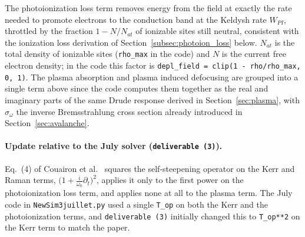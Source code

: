 The photoionization loss term removes energy from the field at exactly the rate needed to promote electrons to the conduction band at the Keldysh rate $W_{PI}$, throttled by the fraction $1-N/N_{at}$ of ionizable sites still neutral, consistent with the ionization loss derivation of Section~\ref{subsec:photoion_loss} below. $N_{at}$ is the total density of ionizable sites (\texttt{rho\_max} in the code) and $N$ is the current free electron density; in the code this factor is \texttt{depl\_field = clip(1 - rho/rho\_max, 0, 1)}. The plasma absorption and plasma induced defocusing are grouped into a single term above since the code computes them together as the real and imaginary parts of the same Drude response derived in Section~\ref{sec:plasma}, with $\sigma_\omega$ the inverse Bremsstrahlung cross section already introduced in Section~\ref{sec:avalanche}.


\paragraph{Update relative to the July solver (\texttt{deliverable~(3)}).} Eq.~(4) of Couairon et al.~\cite{PhysRevB.71.125435} squares the self-steepening operator on the Kerr and Raman terms, $\big(1+\tfrac{i}{\omega_0}\partial_t\big)^2$, applies it only to the first power on the photoionization loss term, and applies none at all to the plasma term. The July code in \texttt{NewSim3juillet.py} used a single \texttt{T\_op} on both the Kerr and the photoionization terms, and \texttt{deliverable~(3)} initially changed this to \texttt{T\_op**2} on the Kerr term to match the paper.

